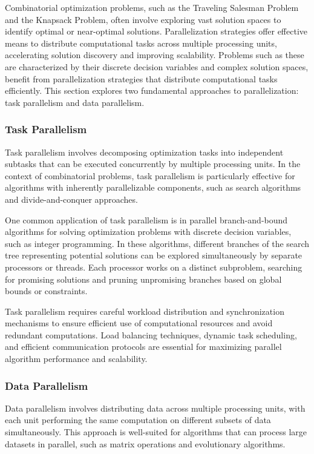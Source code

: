 \documentclass[11pt]{report}
\begin{document}
        Combinatorial optimization problems, such as the Traveling Salesman Problem and the Knapsack Problem, often involve exploring vast solution spaces to identify optimal or near-optimal solutions. Parallelization strategies offer effective means to distribute computational tasks across multiple processing units, accelerating solution discovery and improving scalability\cite{755612}. Problems such as these are characterized by their discrete decision variables and complex solution spaces, benefit from parallelization strategies that distribute computational tasks efficiently. This section explores two fundamental approaches to parallelization: task parallelism and data parallelism.

        \subsubsection{Task Parallelism}
            Task parallelism involves decomposing optimization tasks into independent subtasks that can be executed concurrently by multiple processing units. In the context of combinatorial problems, task parallelism is particularly effective for algorithms with inherently parallelizable components, such as search algorithms and divide-and-conquer approaches.

            One common application of task parallelism is in parallel branch-and-bound algorithms for solving optimization problems with discrete decision variables, such as integer programming. In these algorithms, different branches of the search tree representing potential solutions can be explored simultaneously by separate processors or threads. Each processor works on a distinct subproblem, searching for promising solutions and pruning unpromising branches based on global bounds or constraints.
        
            Task parallelism requires careful workload distribution and synchronization mechanisms to ensure efficient use of computational resources and avoid redundant computations. Load balancing techniques, dynamic task scheduling, and efficient communication protocols are essential for maximizing parallel algorithm performance and scalability.

        \subsubsection{Data Parallelism}
            Data parallelism involves distributing data across multiple processing units, with each unit performing the same computation on different subsets of data simultaneously. This approach is well-suited for algorithms that can process large datasets in parallel, such as matrix operations and evolutionary algorithms.
\end{document}
